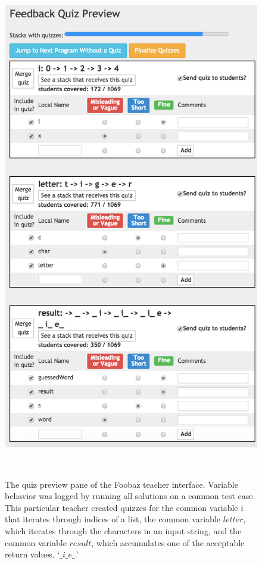 \begin{figure}
\begin{minipage}{1\columnwidth}
\centering
\includegraphics[width=0.85\columnwidth]{Body/figures/foobaz/quizPreviewHangman.png}
\caption{The quiz preview pane of the Foobaz teacher interface. Variable behavior was logged by running all solutions on a common test case. This particular teacher created quizzes for the common variable $i$ that iterates through indices of a list, the common variable $letter$, which iterates through the characters in an input string, and the common variable $result$, which accumulates one of the acceptable return values, `$\_i\_e\_$.'}~\label{fig:figure3}
\end{minipage}


\end{figure}
